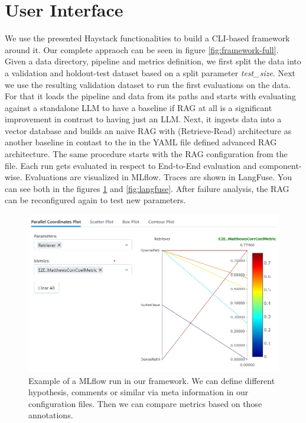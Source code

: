 \section{User Interface}

We use the presented Haystack functionalities to build a CLI-based framework around it. Our complete appraoch can be seen in figure \ref{fig:framework-full}. Given a data directory, pipeline and metrics definition, we first split the data into a validation and holdout-test dataset based on a split parameter \textit{test\_size}. Next we use the resulting validation dataset to run the first evaluations on the data. For that it loads the pipeline and data from its paths and starts with evaluating against a standalone LLM to have a baseline if RAG at all is a significant improvement in contrast to having just an LLM. Next, it ingests data into a vector database and builds an naive RAG with (Retrieve-Read) architecture as another baseline in contast to the in the YAML file defined advanced RAG architecture. The same procedure starts with the RAG configuration from the file. Each run gets evaluated in respect to End-to-End evaluation and component-wise. Evaluations are visualized in MLflow. Traces are shown in LangFuse. You can see both in the figures \ref{fig:mlflow} and \ref{fig:langfuse}. After failure analysis, the RAG can be reconfigured again to test new parameters. 

\begin{figure}
  \centering
  \includegraphics[width=\textwidth]{images/MLFlow-Vis.png}
  \caption{Example of a MLflow run in our framework. We can define different hypothesis, comments or similar via meta information in our configuration files. Then we can compare metrics based on those annotations.}
  \label{fig:mlflow}
\end{figure}

